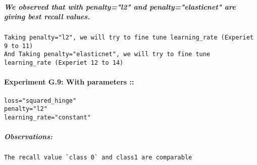 \documentclass[11pt]{article}
\begin{document}
    \subparagraph{We observed that with penalty="l2" and
penalty="elasticnet" are giving best recall
values.}\label{we-observed-that-with-penaltyl2-and-penaltyelasticnet-are-giving-best-recall-values.}

\begin{verbatim}
Taking penalty="l2", we will try to fine tune learning_rate (Experiet 9 to 11)
And Taking penalty="elasticnet", we will try to fine tune learning_rate (Experiet 12 to 14)
\end{verbatim}

    \paragraph{Experiment G.9: With parameters
::}\label{experiment-g.9-with-parameters}

\begin{verbatim}
loss="squared_hinge"
penalty="l2"
learning_rate="constant"
\end{verbatim}

\subparagraph{Observations:}\label{observations}

\begin{verbatim}
The recall value `class 0` and class1 are comparable
\end{verbatim}
\end{document}
